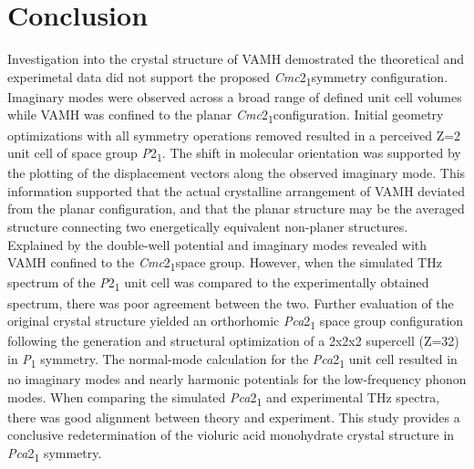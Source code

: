 \section{Conclusion}
Investigation into the crystal structure of VAMH demostrated the theoretical and experimetal data did not support the proposed \textit{Cmc}2\textsubscript{1}symmetry configuration. Imaginary modes were observed across a broad range of defined unit cell volumes while VAMH was confined to the planar \textit{Cmc}2\textsubscript{1}configuration. Initial geometry optimizations with all symmetry operations removed resulted in a perceived Z=2 unit cell of space group \textit{P}2\textsubscript{1}. The shift in molecular orientation was supported by the plotting of the displacement vectors along the observed imaginary mode. This information supported that the actual crystalline arrangement of VAMH deviated from the planar configuration, and that the planar structure may be the averaged structure connecting two energetically equivalent non-planer structures. Explained by the double-well potential and imaginary modes revealed with VAMH confined to the \textit{Cmc}2\textsubscript{1}space group. However, when the simulated THz spectrum of the \textit{P}2\textsubscript{1} unit cell was compared to the experimentally obtained spectrum, there was poor agreement between the two. Further evaluation of the original crystal structure yielded an orthorhomic \textit{Pca}2\textsubscript{1} space group configuration following the generation and structural optimization of a 2x2x2 supercell (Z=32) in \textit{P}\textsubscript{1} symmetry. The normal-mode calculation for the \textit{Pca}2\textsubscript{1} unit cell resulted in no imaginary modes and nearly harmonic potentials for the low-frequency phonon modes. When comparing the simulated \textit{Pca}2\textsubscript{1} and experimental THz spectra, there was good alignment between theory and experiment. This study provides a conclusive redetermination of the violuric acid monohydrate crystal structure in \textit{Pca}2\textsubscript{1} symmetry.

